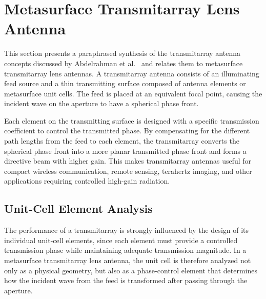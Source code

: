 
\section{Metasurface Transmitarray Lens Antenna}
This section presents a paraphrased synthesis of the transmitarray antenna concepts discussed by Abdelrahman et al.~\cite{Abdelrahman2017} and relates them to metasurface transmitarray lens antennas. A transmitarray antenna consists of an illuminating feed source and a thin transmitting surface composed of antenna elements or metasurface unit cells. The feed is placed at an equivalent focal point, causing the incident wave on the aperture to have a spherical phase front.

Each element on the transmitting surface is designed with a specific transmission coefficient to control the transmitted phase. By compensating for the different path lengths from the feed to each element, the transmitarray converts the spherical phase front into a more planar transmitted phase front and forms a directive beam with higher gain. This makes transmitarray antennas useful for compact wireless communication, remote sensing, terahertz imaging, and other applications requiring controlled high-gain radiation.

\subsection{Unit-Cell Element Analysis}
The performance of a transmitarray is strongly influenced by the design of its individual unit-cell elements, since each element must provide a controlled transmission phase while maintaining adequate transmission magnitude. In a metasurface transmitarray lens antenna, the unit cell is therefore analyzed not only as a physical geometry, but also as a phase-control element that determines how the incident wave from the feed is transformed after passing through the aperture.

